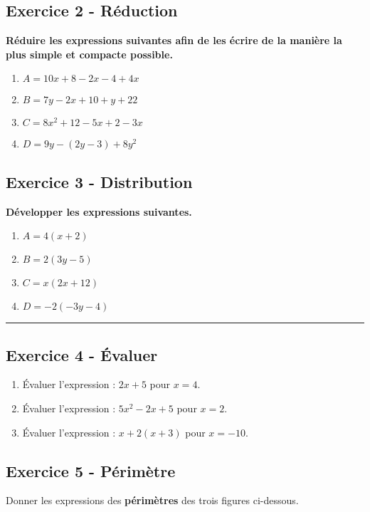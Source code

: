 \documentclass[12pt]{article}
\newcommand{\horrule}[1]{\rule{\linewidth}{#1}} %
\begin{document}
\begin{multicols}{2}

  \subsection*{Exercice 2 - Réduction}
  \textbf{Réduire les expressions suivantes afin de les écrire de la manière la plus simple et compacte possible.}

  \begin{enumerate}
  \item $A = 10x + 8 - 2x - 4 + 4x$
  \item $B = 7y -2x + 10 + y + 22$
  \item $C = 8x^2 + 12 - 5x + 2 - 3x$ 
  \item $D = 9y - (2y -3) + 8y^2$
  \end{enumerate}

  \subsection*{Exercice 3 - Distribution}

  \textbf{Développer les expressions suivantes.}
  \begin{enumerate}
  \item $A = 4(x + 2)$
  \item $B = 2(3y - 5)$
  \item $C = x(2x +12)$ 
  \item $D = -2(-3y - 4)$
  \end{enumerate}

\end{multicols}

\horrule{1px}

\begin{multicols}{2}
  \subsection*{Exercice 4 - Évaluer}

  \begin{enumerate}
  \item Évaluer l'expression : $2x +5$ pour $x = 4$.
  \item Évaluer l'expression : $5x^2 - 2x + 5$ pour $x = 2$.
  \item Évaluer l'expression : $x + 2(x +3)$ pour $x = -10$.
  \end{enumerate}

  \subsection*{Exercice 5 - Périmètre}

  Donner les expressions des \textbf{périmètres} des trois figures ci-dessous.

\end{multicols}
\end{document}
